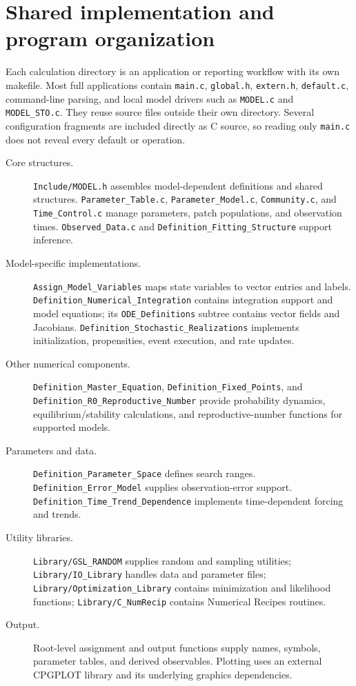 \documentclass[11pt,a4paper]{article}
\DeclareRobustCommand{\code}[1]{\nolinkurl{#1}}
\begin{document}
\section{Shared implementation and program organization}
Each calculation directory is an application or reporting workflow with its own makefile. Most full applications contain \code{main.c}, \code{global.h}, \code{extern.h}, \code{default.c}, command-line parsing, and local model drivers such as \code{MODEL.c} and \code{MODEL_STO.c}. They reuse source files outside their own directory. Several configuration fragments are included directly as C source, so reading only \code{main.c} does not reveal every default or operation.

\begin{description}
\item[Core structures.] \code{Include/MODEL.h} assembles model-dependent definitions and shared structures. \code{Parameter_Table.c}, \code{Parameter_Model.c}, \code{Community.c}, and \code{Time_Control.c} manage parameters, patch populations, and observation times. \code{Observed_Data.c} and \code{Definition_Fitting_Structure} support inference.
\item[Model-specific implementations.] \code{Assign_Model_Variables} maps state variables to vector entries and labels. \code{Definition_Numerical_Integration} contains integration support and model equations; its \code{ODE_Definitions} subtree contains vector fields and Jacobians. \code{Definition_Stochastic_Realizations} implements initialization, propensities, event execution, and rate updates.
\item[Other numerical components.] \code{Definition_Master_Equation}, \code{Definition_Fixed_Points}, and \code{Definition_R0_Reproductive_Number} provide probability dynamics, equilibrium/stability calculations, and reproductive-number functions for supported models.
\item[Parameters and data.] \code{Definition_Parameter_Space} defines search ranges. \code{Definition_Error_Model} supplies observation-error support. \code{Definition_Time_Trend_Dependence} implements time-dependent forcing and trends.
\item[Utility libraries.] \code{Library/GSL_RANDOM} supplies random and sampling utilities; \code{Library/IO_Library} handles data and parameter files; \code{Library/Optimization_Library} contains minimization and likelihood functions; \code{Library/C_NumRecip} contains Numerical Recipes routines.
\item[Output.] Root-level assignment and output functions supply names, symbols, parameter tables, and derived observables. Plotting uses an external CPGPLOT library and its underlying graphics dependencies.
\end{description}
\end{document}
